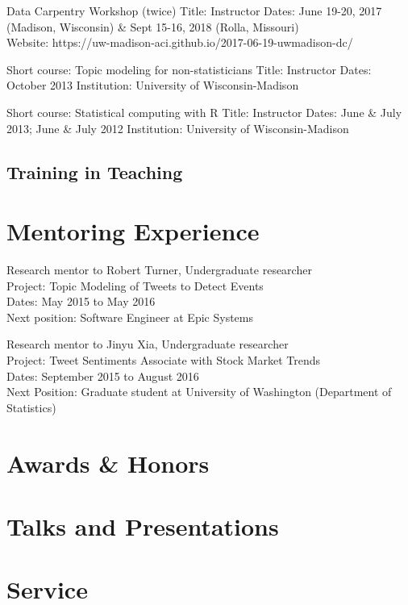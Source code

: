 \documentclass[
  11pt,
  letterpaper,
  DIV=11,
  numbers=noendperiod]{scrartcl}
\begin{document}
Data Carpentry Workshop (twice) Title: Instructor Dates: June 19-20,
2017 (Madison, Wisconsin) \& Sept 15-16, 2018 (Rolla, Missouri)\\
Website: https://uw-madison-aci.github.io/2017-06-19-uwmadison-dc/

Short course: Topic modeling for non-statisticians Title: Instructor
Dates: October 2013 Institution: University of Wisconsin-Madison

Short course: Statistical computing with R Title: Instructor Dates: June
\& July 2013; June \& July 2012 Institution: University of
Wisconsin-Madison

\hypertarget{training-in-teaching}{%
\subsection{Training in Teaching}\label{training-in-teaching}}

\hypertarget{mentoring-experience}{%
\section{Mentoring Experience}\label{mentoring-experience}}

Research mentor to Robert Turner, Undergraduate researcher\\
Project: Topic Modeling of Tweets to Detect Events\\
Dates: May 2015 to May 2016\\
Next position: Software Engineer at Epic Systems

Research mentor to Jinyu Xia, Undergraduate researcher\\
Project: Tweet Sentiments Associate with Stock Market Trends\\
Dates: September 2015 to August 2016\\
Next Position: Graduate student at University of Washington (Department
of Statistics)

\hypertarget{awards-honors}{%
\section{Awards \& Honors}\label{awards-honors}}

\hypertarget{talks-and-presentations}{%
\section{Talks and Presentations}\label{talks-and-presentations}}

\hypertarget{service}{%
\section{Service}\label{service}}
\end{document}

